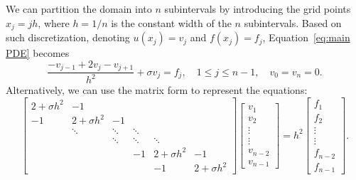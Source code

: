 \documentclass[letterpaper,12pt]{article}
\begin{document}
We can partition the domain into $n$ subintervals by introducing the grid points $x_j = jh$, where $h=1/n$ is the constant width of the $n$
subintervals. Based on such discretization, denoting $u(x_j) = v_j$ and $f(x_j) = f_j$, Equation~\eqref{eq:main PDE} becomes
\begin{equation}
\frac{-v_{j-1}+2 v_{j}-v_{j+1}}{h^{2}}+\sigma v_{j}=f_j, \quad 1 \leq j \leq n-1, \quad v_{0}=v_{n}=0.
\end{equation}
Alternatively, we can use the matrix form to represent the equations:
\begin{equation}\label{eq:main_PDE_matrix}
\left[\begin{array}{cccccc}
2+\sigma h^{2} & -1 & & & & \\
-1 & 2+\sigma h^{2} & -1 & & & \\
& \ddots & \ddots & \ddots & & \\
& & \ddots & \ddots & \ddots & \\
& & & -1 &  2+\sigma h^{2} & -1 \\
& & & & -1 & 2+\sigma h^{2}
\end{array}\right]\left[\begin{array}{c}
v_{1} \\
v_2 \\
\vdots \\
\vdots \\
v_{n-2}\\
v_{n-1}
\end{array}\right]=h^2\left[\begin{array}{c}
f_{1} \\
f_2   \\
\vdots \\
\vdots \\
f_{n-2} \\
f_{n-1}
\end{array}\right].
\end{equation}
\end{document}
